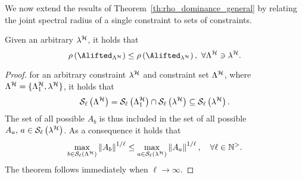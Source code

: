 We now extend the results of Theorem~\ref{th:rho_dominance_general} by relating the joint spectral radius of a single constraint to sets of constraints.
\begin{theorem}%
    \label{th:rho_dominance_set_general}%
    Given an arbitrary \ewhc{} $\lambda^{\mathcal{H}}$, it holds that
    $$
        \rho\left(\Alifted_{\Lambda^\strat}\right) \leq \rho \left( \Alifted_{\lambda^\strat} \right) ,\,\, \forall \Lambda^\strat \ni \lambda^\strat.
    $$

    \begin{proof}
         for an arbitrary constraint $\lambda^{\mathcal{H}}$ and constraint set $\Lambda^{\mathcal{H}}$, where $\Lambda^{\mathcal{H}} = \{ \Lambda^{\mathcal{H}}_1, \lambda^{\mathcal{H}} \}$, it holds that
        \begin{equation}
            \mathcal{S}_{\ell}\left( \Lambda^{\mathcal{H}}  \right) = \mathcal{S}_{\ell}\left(  \Lambda^{\mathcal{H}}_1  \right) \cap \mathcal{S}_{\ell}\left(  \lambda^{\mathcal{H}}  \right) \subseteq \mathcal{S}_{\ell}\left(  \lambda^{\mathcal{H}}  \right).
        \end{equation}
        The set of all possible $A_{b}$ is thus included in the set of all possible $A_{a},\, a \in \mathcal{S}_{\ell}\left(  \lambda^{\mathcal{H}}  \right)$.
        As a consequence it holds that
        \begin{equation*}
            \max_{b \in \mathcal{S}_{\ell}\left(  \Lambda^{\mathcal{H}}  \right) } \left\lVert A_{b}\right\rVert^{1/\ell} \leq
            \max_{a \in \mathcal{S}_{\ell}\left(  \lambda^{\mathcal{H}}  \right) } \left\lVert A_{a}\right\rVert^{1/\ell}, \quad
            \forall \ell\in\mathbb{N}^{>}.
        \end{equation*}
        The theorem follows immediately when $\ell\rightarrow \infty$.
    \end{proof}
\end{theorem}

